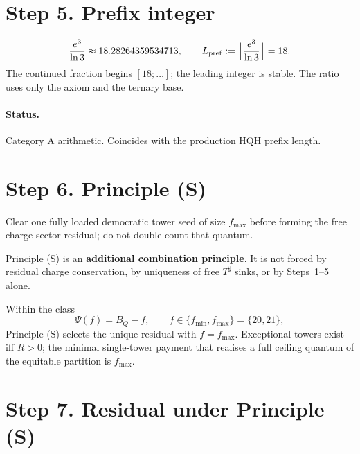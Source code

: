 \section{Step 5. Prefix integer}

\begin{equation}
\frac{e^{3}}{\ln 3}
\approx
18.28264359534713,
\qquad
L_{\mathrm{pref}}
:=
\Bigl\lfloor\frac{e^{3}}{\ln 3}\Bigr\rfloor
=
18.
\end{equation}
The continued fraction begins \([18;\ldots]\); the leading integer is stable. The ratio uses only the axiom and the ternary base.

\paragraph{Status.} Category A arithmetic. Coincides with the production HQH prefix length.

\section{Step 6. Principle (S)}

\begin{definition}[Principle (S)]
\label{def:principle-S}
Clear one fully loaded democratic tower seed of size \(f_{\max}\) before forming the free charge-sector residual; do not double-count that quantum.
\end{definition}

Principle (S) is an \textbf{additional combination principle}. It is not forced by residual charge conservation, by uniqueness of free \(T^{\sharp}\) sinks, or by Steps~1--5 alone.

Within the class
\[
\Psi(f)=B_{Q}-f,
\qquad
f\in\{f_{\min},f_{\max}\}=\{20,21\},
\]
Principle (S) selects the unique residual with \(f=f_{\max}\). Exceptional towers exist iff \(R>0\); the minimal single-tower payment that realises a full ceiling quantum of the equitable partition is \(f_{\max}\).

\section{Step 7. Residual under Principle (S)}


